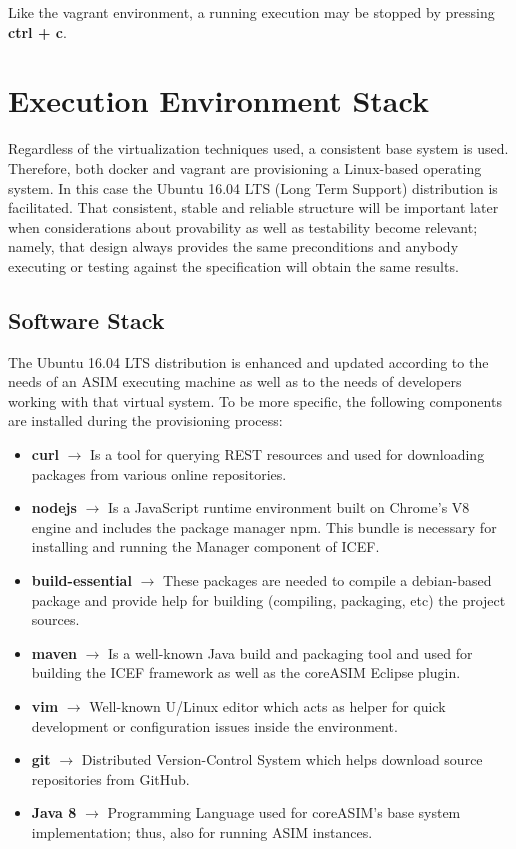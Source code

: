 Like the vagrant environment, a running execution may be stopped by pressing \textbf{ctrl + c}.

\section{Execution Environment Stack}
\label{sec:exec-env-stack}
Regardless of the virtualization techniques used, a consistent base system is used. Therefore, both docker and vagrant are provisioning a Linux-based operating system. In this case the Ubuntu 16.04 LTS (Long Term Support) distribution is facilitated. That consistent, stable and reliable structure will be important later when considerations about provability as well as testability become relevant; namely, that design always provides the same preconditions and anybody executing or testing against the specification will obtain the same results.

\subsection{Software Stack}
\label{sec:env-exec-stack-software-stack}

The Ubuntu 16.04 LTS distribution is enhanced and updated according to the needs of an ASIM executing machine as well as to the needs of developers working with that virtual system. To be more specific, the following components are installed during the provisioning process:

\begin{itemize}
	\item \textbf{curl} $\rightarrow$ Is a tool for querying REST resources and used for downloading packages from various online repositories.
	\item \textbf{nodejs} $\rightarrow$ Is a JavaScript runtime environment built on Chrome's V8 engine and includes the package manager npm. This bundle is necessary for installing and running the Manager component of ICEF.
	\item \textbf{build-essential} $\rightarrow$ These packages are needed to compile a debian-based package and provide help for building (compiling, packaging, etc) the project sources.
	\item \textbf{maven} $\rightarrow$ Is a well-known Java build and packaging tool and used for building the ICEF framework as well as the coreASIM Eclipse plugin.
	\item \textbf{vim} $\rightarrow$ Well-known U/Linux editor which acts as helper for quick development or configuration issues inside the environment.
	\item \textbf{git} $\rightarrow$ Distributed Version-Control System which helps download source repositories from GitHub.
	\item \textbf{Java 8} $\rightarrow$ Programming Language used for coreASIM's base system implementation; thus, also for running ASIM instances.
\end{itemize}

